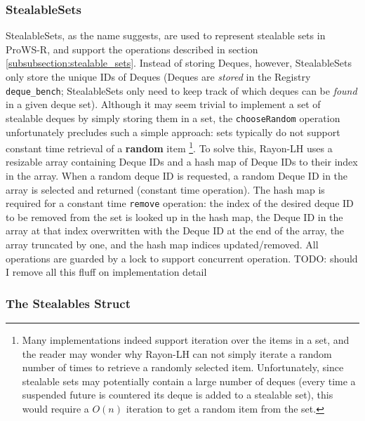 \documentclass[bsc,frontabs,singlespacing,parskip,deptreport,normalheadings]{infthesis}
\begin{document}
\subsubsection*{StealableSets}

StealableSets, as the name suggests, are used to represent stealable sets in
ProWS-R, and support the operations described in section
\ref{subsubsection:stealable_sets}. Instead of storing Deques, however,
StealableSets only store the unique IDs of Deques (Deques are \textit{stored} in
the Registry \texttt{deque\_bench}; StealableSets only need to keep track of
which deques can be \textit{found} in a given deque set). Although it may seem
trivial to implement a set of stealable deques by simply storing them in a set,
the \texttt{chooseRandom} operation unfortunately precludes such a simple
approach: sets typically do not support constant time retrieval of a
\textbf{random} item \footnote{Many implementations indeed support iteration
    over the items in a set, and the reader may wonder why Rayon-LH can not
    simply iterate a random number of times to retrieve a randomly selected
    item. Unfortunately, since stealable sets may potentially contain a large
    number of deques (every time a suspended future is countered its deque is
    added to a stealable set), this would require a \(O(n)\) iteration to get a
random item from the set.}. To solve this, Rayon-LH uses a resizable array
containing Deque IDs and a hash map of Deque IDs to their index in the
array. When a random deque ID is requested, a random Deque ID in the array
is selected and returned (constant time operation). The hash map is required for
a constant time \texttt{remove} operation: the index of the desired deque ID to
be removed from the set is looked up in the hash map, the Deque ID in the array
at that index overwritten with the Deque ID at the end of the array, the array
truncated by one, and the hash map indices updated/removed. All operations are
guarded by a lock to support concurrent operation. TODO: should I remove all
this fluff on implementation detail

\subsubsection*{The Stealables Struct}
\label{subsubsection:the_stealables_struct}
\end{document}
